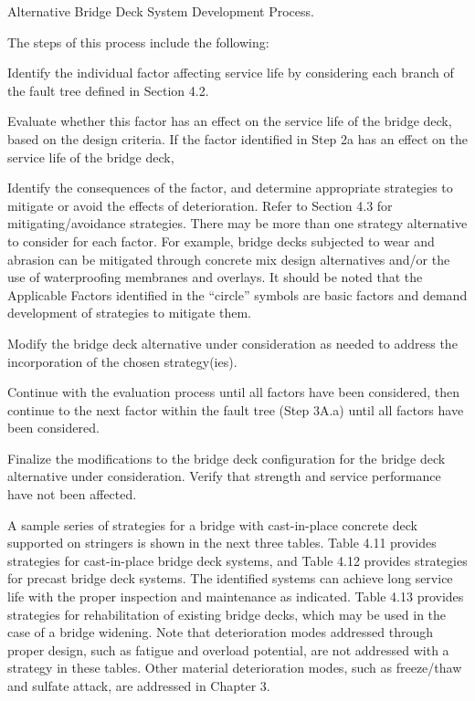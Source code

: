 \begin{table}
  \caption{Alternative Bridge Deck System Development Process.}
  \label{tab:alternative-deck-development}
\end{table}

The steps of this process include the following:
\begin{description}[style=nextline,leftmargin=6em]
  \item[Step 1A.] Identify the individual factor affecting service life by considering each branch of the fault tree defined in Section 4.2.
  \item[Step 2A.]Evaluate whether this factor has an effect on the service life of the bridge deck, based on the design
  criteria. If the factor identified in Step 2a has an effect on the service life of the bridge deck,
  \item[Step 2A.a.] Identify the consequences of the factor, and determine appropriate strategies to mitigate or avoid the
  effects of deterioration. Refer to Section 4.3 for mitigating/avoidance strategies. There may be more
  than one strategy alternative to consider for each factor. For example, bridge decks subjected to
  wear and abrasion can be mitigated through concrete mix design alternatives and/or the use of
  waterproofing membranes and overlays. It should be noted that the Applicable Factors identified in
  the “circle” symbols are basic factors and demand development of strategies to mitigate them.
  \item[Step 2A.b.] Modify the bridge deck alternative under consideration as needed to address the incorporation of the
  chosen strategy(ies).
  \item[Step 3A:]Continue with the evaluation process until all factors have been considered, then continue to the next
  factor within the fault tree (Step 3A.a) until all factors have been considered.
  \item[Step 4A:] Finalize the modifications to the bridge deck configuration for the bridge deck alternative under
  consideration. Verify that strength and service performance have not been affected.
\end{description}

A sample series of strategies for a bridge with cast-in-place concrete deck supported on stringers is shown in the
next three tables. Table 4.11 provides strategies for cast-in-place bridge deck systems, and Table 4.12 provides
strategies for precast bridge deck systems. The identified systems can achieve long service life with the proper
inspection and maintenance as indicated. Table 4.13 provides strategies for rehabilitation of existing bridge decks,
which may be used in the case of a bridge widening. Note that deterioration modes addressed through proper design,
such as fatigue and overload potential, are not addressed with a strategy in these tables. Other material deterioration
modes, such as freeze/thaw and sulfate attack, are addressed in Chapter 3.

